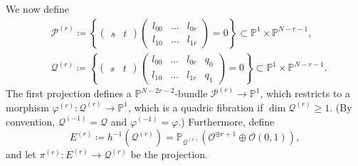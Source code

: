 \documentclass[JEP,XML,SOM,Unicode,NoEqCountersInSection,published]{cedram}
\theoremstyle{plain}
\theoremstyle{definition}
\let\phi\varphi
\renewcommand\P{\mathbb{P}}
\renewcommand\O{\mathcal{O}}
\begin{document}
We now define
\begin{align*}
&\mathcal{P}^{(r)}\coloneqq
\left\{
\begin{pmatrix}
s & t
\end{pmatrix}
\begin{pmatrix}
l_{00} & \dots &l_{0r}\\
l_{10} & \dots & l_{1r}
\end{pmatrix}
=0
\right\}
\subset \P^1\times \P^{N-r-1}, \\
&\mathcal{Q}^{(r)}
\coloneqq
\left\{
\begin{pmatrix}
s & t
\end{pmatrix}
\begin{pmatrix}
l_{00} & \dots &l_{0r} & q_0\\
l_{10} & \dots & l_{1r} & q_1
\end{pmatrix}
=0
\right\}
\subset \P^1\times \P^{N-r-1}.
\end{align*}
The first projection defines a $\P^{N-2r-2}$-bundle $\mathcal{P}^{(r)}\to \P^1$, which restricts to a morphism $\phi^{(r)}\colon \mathcal{Q}^{(r)}\to \P^1$, which is a quadric fibration if \(\dim\mathcal Q^{(r)} \geq 1\).
(By convention, $\mathcal{Q}^{(-1)}=\mathcal{Q}$ and $\phi^{(-1)}=\phi$.)
Furthermore, define
\[
E^{(r)}\coloneqq h^{-1}(\mathcal{Q}^{(r)})=\P_{\mathcal{Q}^{(r)}}(\O^{\oplus r+1}\oplus \O(0,1)),
\]
and let $\pi^{(r)}\colon E^{(r)}\to \mathcal{Q}^{(r)}$ be the projection.
\end{document}
